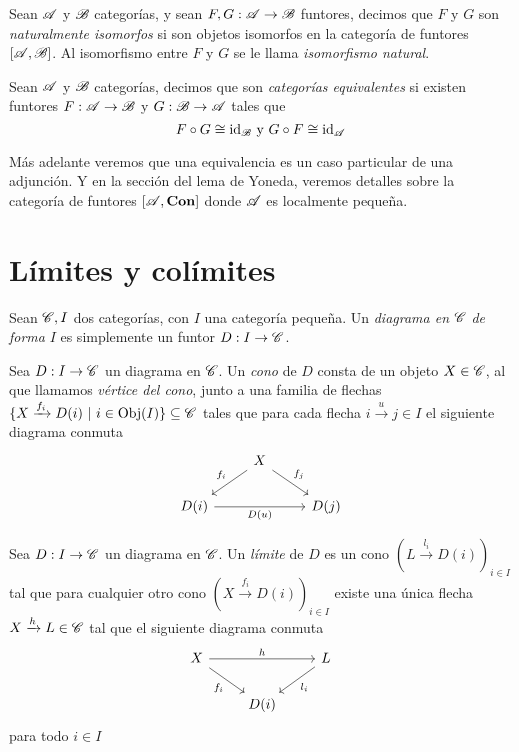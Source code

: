 \documentclass{comunicaciones}
\begin{document}
\begin{dfn}
Sean $\mathscr A$ y $\mathscr B$ categorías, y sean $F,G:\mathscr A\to\mathscr B$ funtores, decimos que $F$ y $G$ son \emph{naturalmente isomorfos} si son objetos isomorfos en la 
categoría de funtores $[\mathscr A,\mathscr B]$. Al isomorfismo entre $F$ y $G$ se le llama \emph{isomorfismo natural}.
\end{dfn}

\begin{dfn}
Sean $\mathscr A$ y $\mathscr B$ categorías, decimos que son \emph{categorías equivalentes} si existen funtores $F:\mathscr A\to \mathscr B$ y $G:\mathscr B\to\mathscr A$ tales que
\begin{equation*}
F\circ G\cong \mathrm{id}_\mathscr B \text{ y }G\circ F\cong \mathrm{id}_\mathscr A
\end{equation*}
\end{dfn}
Más adelante veremos que una equivalencia es un caso particular de una adjunción. Y en la sección del lema de Yoneda, veremos detalles 
sobre la categoría de funtores $[\mathscr A,\mathbf{Con}]$ donde $\mathscr A$ es localmente pequeña.

\section{Límites y colímites}

\begin{dfn}[Diagrama]
    Sean $\mathscr C,I$ dos categorías, con $I$ una categoría pequeña. Un \emph{diagrama en} $\mathscr C$ \emph{de forma} $I$ es simplemente un funtor $D:I\to\mathscr C$.   
\end{dfn}

\begin{dfn}
    Sea $D:I\to\mathscr C$ un diagrama en $\mathscr C$. Un \emph{cono} de $D$ consta de un objeto $X\in\mathscr C$, al que llamamos \emph{vértice del cono}, junto a una familia
    de flechas $\{X\xrightarrow{f_i}D(i) \ |\ i\in\Obj(I)\}\subseteq\C$ tales que para cada flecha $i\xrightarrow{u}j\in I$ el siguiente diagrama conmuta
    \[\begin{tikzcd}
        & X \\
        {D(i)} && {D(j)}
        \arrow["{f_i}"', from=1-2, to=2-1]
        \arrow["{f_j}", from=1-2, to=2-3]
        \arrow["{D(u)}"', from=2-1, to=2-3]
    \end{tikzcd}\]
\end{dfn}

\begin{dfn}
    Sea $D:I\to\mathscr C$ un diagrama en $\mathscr C$. Un \emph{límite} de $D$ es un cono $(L\xrightarrow{l_i}D(i))_{i\in I}$ tal que para cualquier otro cono $(X\xrightarrow{f_i}D(i))_{i\in I}$
    existe una única flecha $X\xrightarrow{h}L\in\mathscr C$ tal que el siguiente diagrama conmuta
    \[\begin{tikzcd}
        X && L \\
        & {D(i)}
        \arrow["h", from=1-1, to=1-3]
        \arrow["{f_i}"', from=1-1, to=2-2]
        \arrow["{l_i}", from=1-3, to=2-2]
    \end{tikzcd}\] para todo $i\in I$
\end{dfn}
\end{document}
